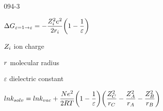 \begin{mitframe}{094-3}
\begin{listone}
	\item $\iipf\gibbs_{\varepsilon=1\rightarrow\varepsilon}=-\dfrac{\compress_{\state}^2\e^2}{2\pos_{\state}}\bigg(1-\dfrac{1}{\varepsilon}\bigg)$
    	\begin{listtwo}
        		\item $\compress_{\state}$ ion charge
                \item $\pos$ molecular radius
                \item $\varepsilon$ dielectric constant
        \end{listtwo}
\item $ln\thermcond_{solv}=ln\thermcond_{vac}+\dfrac{\nummoles\e^2}{2\gasconst\Temp}\bigg(1-\dfrac{1}{\varepsilon}\bigg)\bigg(\dfrac{\compress_{\conc}^2}{\pos_{\conc}}-\dfrac{\compress^2_{\helmholtz}}{\pos_{\helmholtz}}-\dfrac{\compress^2_{\exergy}}{\pos_{\exergy}}\bigg)$

\end{listone}    
\end{mitframe}